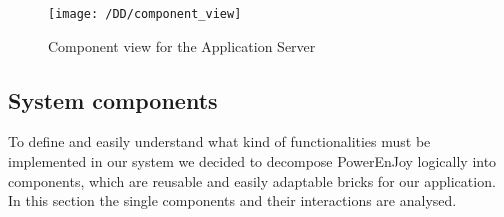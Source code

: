 \begin{figure}[!ht]
    \centering
    \vspace{0.2cm}
    \texttt{[image: /DD/component\_view]}\\
    \vspace{0.4cm}
    \caption{Component view for the Application Server} 
    \label{fig:component_view} 
\end{figure}

\subsection{System components}
To define and easily understand what kind of functionalities must be implemented in our system we decided to decompose PowerEnJoy logically into components, which are reusable and easily adaptable bricks for our application. 
\\In this section the single components and their interactions are analysed. 

